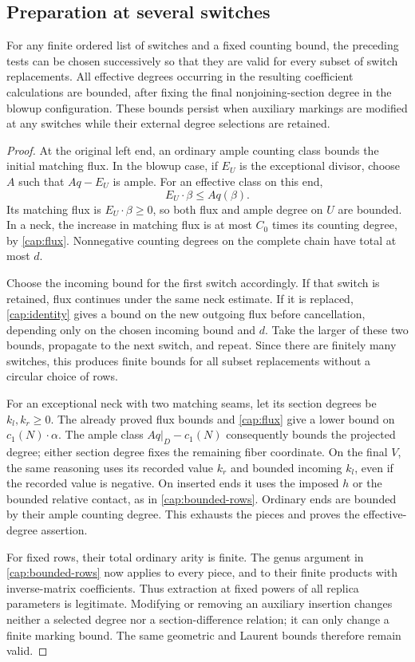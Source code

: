 \subsection{Preparation at several switches}

\begin{lemma}\label{cap:uniform}
For any finite ordered list of switches and a fixed counting bound,
the preceding tests can be chosen successively so that they are
valid for every subset of switch replacements.  All effective
degrees occurring in the resulting coefficient calculations are
bounded, after fixing the final nonjoining-section degree in the
blowup configuration.  These bounds persist when auxiliary
markings are modified at any switches while their external degree
selections are retained.
\end{lemma}
\begin{proof}
At the original left end, an ordinary ample counting class bounds
the initial matching flux.  In the blowup case, if $E_U$ is the
exceptional divisor, choose $A$ such that $Aq-E_U$ is ample.
For an effective class on this end,
\[
             E_U\cdot\beta\leq A q(\beta).
\]
Its matching flux is $E_U\cdot\beta\geq0$, so both flux and ample
degree on $U$ are bounded.  In a neck, the increase in matching
flux is at most $C_0$ times its counting degree, by
\eqref{cap:flux}.  Nonnegative counting degrees on the complete
chain have total at most $d$.

Choose the incoming bound for the first switch accordingly.
If that switch is retained, flux continues under the same neck
estimate.  If it is replaced, \cref{cap:identity} gives a bound on
the new outgoing flux before cancellation, depending only on the
chosen incoming bound and $d$.  Take the larger of these two
bounds, propagate to the next switch, and repeat.  Since there
are finitely many switches, this produces finite bounds for all
subset replacements without a circular choice of rows.

For an exceptional neck with two matching seams, let its section
degrees be $k_l,k_r\geq0$.  The already proved flux bounds and
\eqref{cap:flux} give a lower bound on $c_1(N)\cdot\alpha$.
The ample class $Aq|_D-c_1(N)$ consequently bounds the projected
degree; either section degree fixes the remaining fiber coordinate.
On the final $V$, the same reasoning uses its recorded value
$k_r$ and bounded incoming $k_l$, even if the recorded value is
negative.  On inserted ends it uses the imposed $h$ or the
bounded relative contact, as in \cref{cap:bounded-rows}.  Ordinary
ends are bounded by their ample counting degree.  This exhausts
the pieces and proves the effective-degree assertion.

For fixed rows, their total ordinary arity is finite.  The genus
argument in \cref{cap:bounded-rows} now applies to every piece,
and to their finite products with inverse-matrix coefficients.
Thus extraction at fixed powers of all replica parameters is
legitimate.  Modifying or removing an auxiliary insertion changes
neither a selected degree nor a section-difference relation; it
can only change a finite marking bound.  The same geometric and
Laurent bounds therefore remain valid.
\end{proof}

